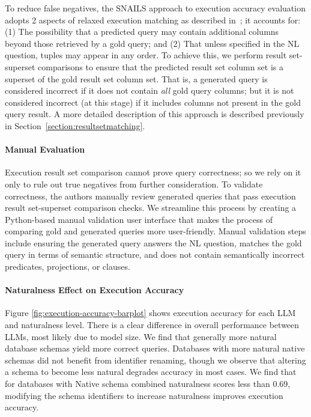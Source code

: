 To reduce false negatives, the SNAILS approach to execution accuracy evaluation adopts 2 aspects of relaxed execution matching as described in~\cite{floratou2024nl2sql}; it accounts for: (1) The possibility that a predicted query may contain additional columns beyond those retrieved by a gold query; and (2) That unless specified in the NL question, tuples may appear in any order.
To achieve this, we perform result set-superset comparisons to ensure that the predicted result set column set is a superset of the gold result set column set.
That is, a generated query is considered incorrect if it does not contain \emph{all} gold query columns; but it is not considered incorrect (at this stage) if it includes columns not present in the gold query result. 
A more detailed description of this approach is described previously in Section~\ref{section:resultsetmatching}.

\paragraph{\textbf{Manual Evaluation}}
Execution result set comparison cannot prove query correctness; so we rely on it only to rule out true negatives from further consideration.
To validate correctness, the authors manually review generated queries that pass execution result set-superset comparison checks.
We streamline this process by creating a Python-based manual validation user interface that makes the process of comparing gold and generated queries more user-friendly.
Manual validation steps include ensuring the generated query answers the NL question, matches the gold query in terms of semantic structure, and does not contain semantically incorrect predicates, projections, or clauses.

\paragraph{\textbf{Naturalness Effect on Execution Accuracy}}

Figure \ref{fig:execution-accuracy-barplot} shows execution accuracy for each LLM and naturalness level.
There is a clear difference in overall performance between LLMs, most likely due to model size.
We find that generally more natural database schemas yield more correct queries.
Databases with more natural native schemas did not benefit from identifier renaming, though we observe that altering a schema to become less natural degrades accuracy in most cases. We find that for databases with Native schema combined naturalness scores less than 0.69, modifying the schema identifiers to increase naturalness improves execution accuracy.

